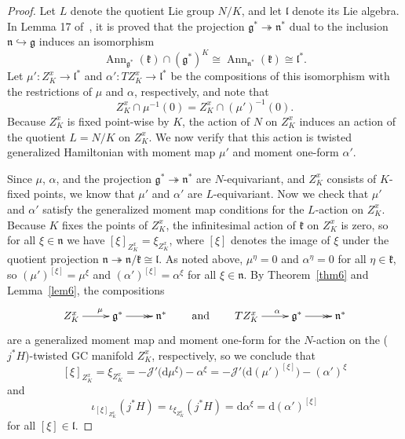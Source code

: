 \documentclass[11pt]{article}
\numberwithin{equation}{section}
\newcommand{\func}[3]{#1 \colon #2 \to #3}
\newcommand{\tang}{T}
\begin{document}
\begin{proof}
Let $L$ denote the quotient Lie group $N/K$, and let $\mathfrak{l}$ denote its Lie algebra.  In Lemma 17 of~\cite{MR1486529}, it is proved that the projection $\mathfrak{g}^* \twoheadrightarrow \mathfrak{n}^*$ dual to the inclusion $\mathfrak{n} \hookrightarrow \mathfrak{g}$ induces an isomorphism
\[
  \operatorname{Ann}_{\mathfrak{g}^*} (\mathfrak{k}) \cap (\mathfrak{g}^*)^K
  \cong
  \operatorname{Ann}_{\mathfrak{n}^*} (\mathfrak{k})
  \cong
  \mathfrak{l}^*.
\]
Let $\func{\mu'}{Z_K^x}{\mathfrak{l}^*}$ and $\func{\alpha'}{\tang Z_K^x}{\mathfrak{l}^*}$ be the compositions of this isomorphism with the restrictions of $\mu$ and $\alpha$, respectively, and note that
\[
  Z_K^x \cap \mu^{-1}(0) = Z_K^x \cap (\mu')^{-1}(0).
\]
Because $Z_K^x$ is f\/ixed point-wise by $K$, the action of $N$ on $Z_K^x$ induces an action of the quotient $L=N/K$ on $Z_K^x$.
We now verify that this action is twisted generalized Hamiltonian with moment map $\mu'$ and moment one-form $\alpha'$.

Since $\mu$, $\alpha$, and the projection $\mathfrak{g}^* \twoheadrightarrow \mathfrak{n}^*$ are $N$-equivariant, and $Z_K^x$ consists of $K$-f\/ixed points, we know that $\mu'$ and $\alpha'$ are $L$-equivariant.  Now we check that $\mu'$ and $\alpha'$ satisfy the generalized moment map conditions for the $L$-action on $Z_K^x$.
Because $K$ f\/ixes the points of $Z_K^x$, the inf\/initesimal action of $\mathfrak{k}$ on $Z_K^x$ is zero, so for all $\xi \in \mathfrak{n}$ we have $[\xi]_{Z_K^x} = \xi_{Z_K^x}$, where $[\xi]$ denotes the image of $\xi$ under the quotient projection $\mathfrak{n} \twoheadrightarrow \mathfrak{n}/\mathfrak{k} \cong \mathfrak{l}$.
As noted above, $\mu^{\eta} = 0$ and $\alpha^{\eta}=0$ for all $\eta \in \mathfrak{k}$, so $(\mu')^{[\xi]} = \mu^{\xi}$ and $(\alpha')^{[\xi]} = \alpha^{\xi}$ for all $\xi \in \mathfrak{n}$.
By Theorem~\ref{thm6} and Lemma~\ref{lem6}, the compositions
  \[
    \xymatrix{
      Z_K^x \ar[r]^{\quad \mu} & \mathfrak{g}^* \ar@{>>}[r] & \mathfrak{n}^*
    }
    \qquad
    \mbox{and}
    \qquad
    \xymatrix{
      \tang Z_K^x \ar[r]^{\quad \alpha}
      & \mathfrak{g}^* \ar@{>>}[r] & \mathfrak{n}^*
    }
  \]
are a generalized moment map and moment one-form for the $N$-action on the ($j^* H$)-twisted GC manifold $Z_K^x$, respectively, so we conclude that
\[
  [\xi]_{Z_K^x} = \xi_{Z_K^x}
  = -\mathcal{J}' \big( \mathrm{d} \mu^{\xi} \big) - \alpha^{\xi}
  = -\mathcal{J}' \big( \mathrm{d} (\mu')^{[\xi]} \big) - (\alpha')^{\xi}
\]
and
\[
  \iota_{[\xi]_{Z_K^x}} (j^* H)
  = \iota_{\xi_{Z_K^x}} (j^* H)
  = \mathrm{d} \alpha^{\xi}
  = \mathrm{d} (\alpha')^{[\xi]}
\]
for all $[\xi] \in \mathfrak{l}$.



\end{proof}
\end{document}
